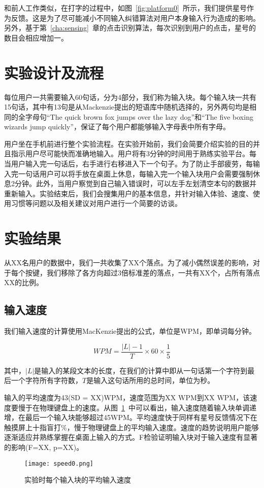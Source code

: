 和前人工作类似\cite{flatglass2011findlater}\cite{2017blindtype}，在打字的过程中，如图~\ref{fig:platform0}~所示，我们提供星号作为反馈。这是为了尽可能减小不同输入纠错算法对用户本身输入行为造成的影响。另外，基于第~\ref{cha:sensing}~章的点击识别算法，每次识别到用户的点击，星号的数目会相应增加一。


\section{实验设计及流程}
每位用户一共需要输入60句话，分为4部分，我们称为输入块。每个输入块一共有15句话，其中有13句是从Mackenzie提出的短语库\cite{mackenzie2003phrase}中随机选择的，另外两句均是相同的全字母句“The quick brown fox jumps over the lazy dog”和“The five boxing wizards jump quickly”，保证了每个用户都能够输入字母表中所有字母。

用户坐在手机前进行整个实验流程。在实验开始前，我们会简要介绍实验的目的并且指示用户尽可能快而准确地输入。用户将有3分钟的时间用于熟练实验平台。每当用户输入完一句话后，右手进行右移进入下一个句子。为了防止手部疲劳，每输入完一句话用户可以将手放在桌面上休息，每输入完一个输入块用户会需要强制休息2分钟。此外，当用户察觉到自己输入错误时，可以左手左划清空本句的数据并重新输入。实验结束后，我们会搜集用户的基本信息，并针对输入体验、速度、使用习惯等问题以及相关建议对用户进行一个简要的访谈。

\section{实验结果}
从XX名用户的数据中，我们一共收集了XX个落点。为了减小偶然误差的影响，对于每个按键，我们移除了各方向超过3倍标准差的落点，一共有XX个，占所有落点XX的比例。

\subsection{输入速度}
我们输入速度的计算使用MacKenzie提出的公式\cite{speedcalc}，单位是WPM，即单词每分钟。

\begin{equation}
    \label{calcspeed}
    WPM = \frac{|L|-1}{T} \times 60 \times \frac{1}{5}
\end{equation}

其中，$|L|$是输入的某段文本的长度，在我们的计算中即从一句话第一个字符到最后一个字符所有字符数，$T$是输入这句话所用的总时间，单位为秒。

输入的平均速度为43(SD = XX)WPM，速度范围为XX WPM到XX WPM，该速度要慢于在物理键盘上的速度。从图~\ref{fig:speed0}~中可以看出，输入速度随着输入块单调递增，在最后一个输入块能够超过45WPM。平均速度快于同样有星号反馈情况下在触摸屏上十指盲打\%\cite{flatglass2011findlater}，慢于物理键盘上的平均输入速度。速度的趋势说明用户能够逐渐适应并熟练掌握在桌面上输入的方式。F检验证明输入块对于输入速度有显著的影响(F=XX, p=XX)。
\begin{figure}[h] %
    \centering
    \texttt{[image: speed0.png]}
    \caption{实验时每个输入块的平均输入速度}
    \label{fig:speed0}
\end{figure}

